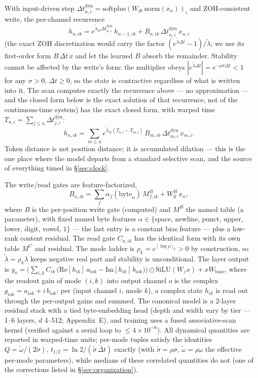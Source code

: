 \documentclass[11pt]{article}
\newcommand{\Dt}{\Delta t}
\begin{document}
With input-driven step $\Dt^{\text{dyn}}_{n,i} = \mathrm{softplus}(W_{dt}\,
\mathrm{norm}(x_n))_i$ and ZOH-consistent write, the per-channel recurrence
\[
h_{n,ik} = e^{\tilde\lambda_{ik}\Dt^{\text{dyn}}_{n,i}}\, h_{n-1,ik}
+ B_{n,ik}\,\Dt^{\text{dyn}}_{n,i}\, x_{n,i}
\]
(the exact ZOH discretization would carry the factor
$(e^{\tilde\lambda\Dt}{-}1)/\tilde\lambda$; we use its first-order form
$B\,\Dt\, x$ and let the learned $B$ absorb the remainder. Stability cannot
be affected by the write's form: the multiplier obeys
$|e^{\tilde\lambda\Dt}| = e^{-\rho\sigma\Dt} < 1$ for any $\sigma > 0$,
$\Dt \ge 0$, so the state is contractive regardless of what is written into
it. The scan
computes exactly the recurrence above --- no approximation --- and the
closed form below is the exact solution of that recurrence, not of the
continuous-time system)
has the exact closed form, with warped time $T_{n,i} = \sum_{j \le n}
\Dt^{\text{dyn}}_{j,i}$:
\[
h_{n,ik} = \sum_{m \le n} e^{\tilde\lambda_{ik}(T_{n,i} - T_{m,i})}\,
B_{m,ik}\,\Dt^{\text{dyn}}_{m,i}\, x_{m,i}.
\]
Token distance is not position distance; it is accumulated dilation ---
this is the one place where the model departs from a standard selective
scan, and the source of everything timed in \S\ref{sec:clock}.

The write/read gates are feature-factorized,
\[
B_{n,ik} = \sum_f \alpha_f(\text{byte}_n)\, M^B_{f,ik} +
W^B_{\text{lr}}\, x_n,
\]
where $B$ is the per-position write gate (computed) and $M^B$ the named
table (a parameter), with fixed named byte features
$\alpha \in \{$space, newline, punct, upper, lower, digit, vowel,
$1\}$ --- the last entry is a constant bias feature --- plus a low-rank
content residual. The read gate $C_{n,ik}$ has the identical form with its
own table $M^C$ and residual. The mode ladder is $\rho_k = e^{[\log
\rho]_k} > 0$ by construction, so $\tilde\lambda = \rho_k\lambda$ keeps
negative real part and stability is unconditional. The layer output is
$y_o = \Big(\sum_{i,k} C_{ik}\,\big(\mathrm{Re}[h_{ik}]\, a_{iok} -
\mathrm{Im}[h_{ik}]\, b_{iok}\big)\Big) \odot
\mathrm{SiLU}(W_z x) + x W_{\text{base}}$,
where the readout gain of mode $(i,k)$ into output channel $o$ is the
complex $g_{iok} = a_{iok} + i\, b_{iok}$: per (input channel $i$, mode
$k$), a complex state $h_{ik}$ is read out through the per-output gains
and summed. The canonical model is a 2-layer residual stack with a tied
byte-embedding head (depth and width vary by tier --- 1--6 layers, $d$
4--512; Appendix~E), and training uses a fused
associative-scan kernel (verified against a serial loop to $\le 4{\times}
10^{-6}$). All dynamical quantities are reported in warped-time units;
per-mode tuples satisfy the identities $Q = \tilde\omega/(2\tilde\sigma)$,
$t_{1/2} = \ln 2 / (\tilde\sigma\,\bar\Dt)$ exactly (with
$\tilde\sigma = \rho\sigma$, $\tilde\omega = \rho\omega$ the effective
per-mode parameters), while medians of these
correlated quantities do not (one of the corrections listed in
\S\ref{sec:organization}).
\end{document}
